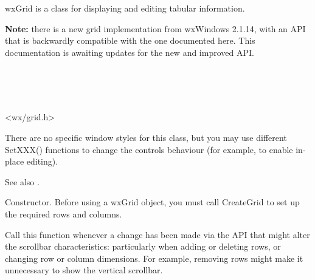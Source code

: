 \section{}\label{wxgrid}

wxGrid is a class for displaying and editing tabular information.

{\bf Note:} there is a new grid implementation from wxWindows 2.1.14,
with an API that is backwardly compatible with the one documented here.
This documentation is awaiting updates for the new and improved API.


\\
\\
\\


<wx/grid.h>


There are no specific window styles for this class, but you may use different
SetXXX() functions to change the controls behaviour (for example, to enable
in-place editing).

See also .




\label{wxgridconstr}


Constructor. Before using a wxGrid object, you must call CreateGrid to set up the required rows and columns.

\label{wxgridadjustscrollbars}


Call this function whenever a change has been made via the API that might alter the scrollbar characteristics:
particularly when adding or deleting rows, or changing row or column dimensions. For example,
removing rows might make it unnecessary to show the vertical scrollbar.


